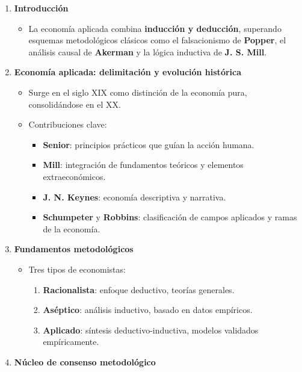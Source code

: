\documentclass[12pt]{book} %
\providecommand{\tightlist}{%
  \setlength{\itemsep}{0pt}\setlength{\parskip}{0pt}}
\begin{document}
\begin{enumerate}
\def\labelenumi{\arabic{enumi}.}
\tightlist
\item
  \textbf{Introducción}

  \begin{itemize}
  \tightlist
  \item
    La economía aplicada combina \textbf{inducción y deducción},
    superando esquemas metodológicos clásicos como el falsacionismo de
    \textbf{Popper}, el análisis causal de \textbf{Akerman} y la lógica
    inductiva de \textbf{J. S. Mill}.
  \end{itemize}
\item
  \textbf{Economía aplicada: delimitación y evolución histórica}

  \begin{itemize}
  \tightlist
  \item
    Surge en el siglo XIX como distinción de la economía pura,
    consolidándose en el XX.
  \item
    Contribuciones clave:

    \begin{itemize}
    \tightlist
    \item
      \textbf{Senior}: principios prácticos que guían la acción humana.
    \item
      \textbf{Mill}: integración de fundamentos teóricos y elementos
      extraeconómicos.
    \item
      \textbf{J. N. Keynes}: economía descriptiva y narrativa.
    \item
      \textbf{Schumpeter} y \textbf{Robbins}: clasificación de campos
      aplicados y ramas de la economía.
    \end{itemize}
  \end{itemize}
\item
  \textbf{Fundamentos metodológicos}

  \begin{itemize}
  \tightlist
  \item
    Tres tipos de economistas:

    \begin{enumerate}
    \def\labelenumii{\arabic{enumii}.}
    \tightlist
    \item
      \textbf{Racionalista}: enfoque deductivo, teorías generales.
    \item
      \textbf{Aséptico}: análisis inductivo, basado en datos empíricos.
    \item
      \textbf{Aplicado}: síntesis deductivo-inductiva, modelos validados
      empíricamente.
    \end{enumerate}
  \end{itemize}
\item
  \textbf{Núcleo de consenso metodológico}


\end{enumerate}
\end{document}
